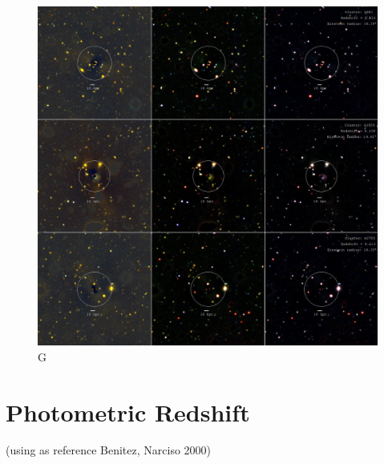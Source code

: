 \begin{figure}[H]
\centering
\includegraphics[width=15cm]{images/full.jpg}
\caption[M]{G}
\end{figure}

\section{Photometric Redshift}

(using as reference Benitez, Narciso 2000)